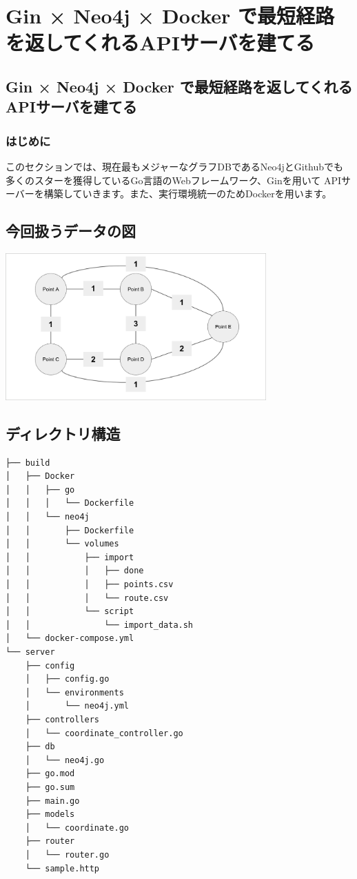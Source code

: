 \chapter{Gin × Neo4j × Docker で最短経路を返してくれるAPIサーバを建てる}

\section{Gin × Neo4j × Docker で最短経路を返してくれるAPIサーバを建てる}
\subsection{はじめに}
このセクションでは、現在最もメジャーなグラフDBであるNeo4jとGithubでも多くのスターを獲得しているGo言語のWebフレームワーク、Ginを用いて
APIサーバーを構築していきます。また、実行環境統一のためDockerを用います。

\section{今回扱うデータの図}
\includegraphics[width=10cm]{./image/03-Tech/chap3/sample_node.png}

\section{ディレクトリ構造}
\begin{tcolorbox}[title=ディレクトリ構造]
    \begin{verbatim}
├── build
│   ├── Docker
│   │   ├── go
│   │   │   └── Dockerfile
│   │   └── neo4j
│   │       ├── Dockerfile
│   │       └── volumes
│   │           ├── import
│   │           │   ├── done
│   │           │   ├── points.csv
│   │           │   └── route.csv
│   │           └── script
│   │               └── import_data.sh
│   └── docker-compose.yml
└── server
    ├── config
    │   ├── config.go
    │   └── environments
    │       └── neo4j.yml
    ├── controllers
    │   └── coordinate_controller.go
    ├── db
    │   └── neo4j.go
    ├── go.mod
    ├── go.sum
    ├── main.go
    ├── models
    │   └── coordinate.go
    ├── router
    │   └── router.go
    └── sample.http
\end{verbatim}
\end{tcolorbox}

